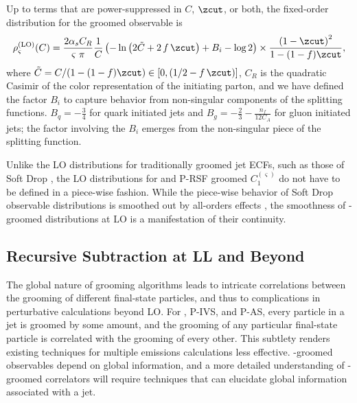 \documentclass[letterpaper,11pt]{article}
\begin{document}
Up to terms that are power-suppressed in \(C\), \(\zcut\), or both, the fixed-order distribution for the groomed observable is
%
\begin{equation}
    \rho^{\rm(LO)}_{\varsigma}(C)
    =
    \frac{2\alpha_s C_R}{\varsigma~\pi}
    \frac{1}{C}
    \left(
        -\ln\left(2 \tilde C + 2\,f\,\zcut\right)
        + B_i - \log 2
    \right)
    \times
    \frac{\left(1 - \zcut\right)^2}{1 - (1-f)\zcut},
    \label{eqn:piranha_LO}
\end{equation}
%
where \(\tilde C = C / (1 - (1-f)\zcut) \in[0, (1/2-f\,\zcut)]\), \(C_R\) is the quadratic Casimir of the color representation of the initiating parton, and we have defined the factor \(B_i\) to capture behavior from non-singular components of the splitting functions.
%
\(B_q = -\frac{3}{4}\) for quark initiated jets and \(B_g = -\frac{2}{3} - \frac{n_f}{12 C_A}\) for gluon initiated jets;
%
the factor involving the \(B_i\) emerges from the non-singular piece of the splitting function.

Unlike the LO distributions for traditionally groomed jet ECFs, such as those of Soft Drop \cite{Larkoski:2014wba}, the LO distributions for  and P-RSF groomed \(C_1^{(\varsigma)}\) do not have to be defined in a piece-wise fashion.
%
%
While the piece-wise behavior of Soft Drop observable distributions is smoothed out by all-orders effects \cite{Benkendorfer:2021unv}, the smoothness of \PIRANHA{}-groomed distributions at LO is a manifestation of their continuity.
%


\subsection{Recursive Subtraction at LL and Beyond}
\label{app:resumresults}

The global nature of \PIRANHA{} grooming algorithms leads to intricate correlations between the grooming of different final-state particles, and thus to complications in perturbative calculations beyond LO.
%
For , P-IVS, and P-AS, every particle in a jet is groomed by some amount, and the grooming of any particular final-state particle is correlated with the grooming of every other.
%
This subtlety renders existing techniques for multiple emissions calculations less effective.
%
\PIRANHA{}-groomed observables depend on global information, and a more detailed understanding of \PIRANHA{}-groomed correlators will require techniques that can elucidate global information associated with a jet.
\end{document}
